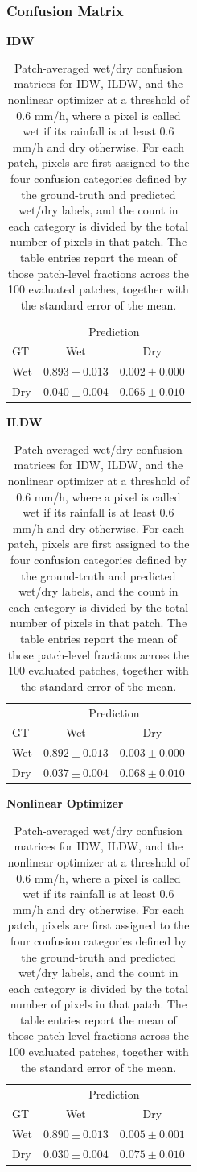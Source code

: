 \subsubsection{Confusion Matrix}
\begin{table}[!htbp]
  \centering
  \begin{minipage}[t]{0.31\textwidth}
    \centering
    \textbf{IDW}

    \vspace{0.35em}
    \scriptsize
    \begin{tabular}{lcc}
      \toprule
       & \multicolumn{2}{c}{Prediction} \\
      GT & Wet & Dry \\
      \midrule
      Wet & $0.893 \pm 0.013$ & $0.002 \pm 0.000$ \\
      Dry & $0.040 \pm 0.004$ & $0.065 \pm 0.010$ \\
      \bottomrule
    \end{tabular}
  \end{minipage}
  \hfill
  \begin{minipage}[t]{0.31\textwidth}
    \centering
    \textbf{ILDW}

    \vspace{0.35em}
    \scriptsize
    \begin{tabular}{lcc}
      \toprule
       & \multicolumn{2}{c}{Prediction} \\
      GT & Wet & Dry \\
      \midrule
      Wet & $0.892 \pm 0.013$ & $0.003 \pm 0.000$ \\
      Dry & $0.037 \pm 0.004$ & $0.068 \pm 0.010$ \\
      \bottomrule
    \end{tabular}
  \end{minipage}
  \hfill
  \begin{minipage}[t]{0.31\textwidth}
    \centering
    \textbf{Nonlinear Optimizer}

    \vspace{0.35em}
    \scriptsize
    \begin{tabular}{lcc}
      \toprule
       & \multicolumn{2}{c}{Prediction} \\
      GT & Wet & Dry \\
      \midrule
      Wet & $0.890 \pm 0.013$ & $0.005 \pm 0.001$ \\
      Dry & $0.030 \pm 0.004$ & $0.075 \pm 0.010$ \\
      \bottomrule
    \end{tabular}
  \end{minipage}
  \caption{Patch-averaged wet/dry confusion matrices for IDW, ILDW, and the nonlinear optimizer at a threshold of $0.6$ mm/h, where a pixel is called wet if its rainfall is at least $0.6$ mm/h and dry otherwise. For each patch, pixels are first assigned to the four confusion categories defined by the ground-truth and predicted wet/dry labels, and the count in each category is divided by the total number of pixels in that patch. The table entries report the mean of those patch-level fractions across the 100 evaluated patches, together with the standard error of the mean.}
  \label{tab:confusion_matrices}
\end{table}
